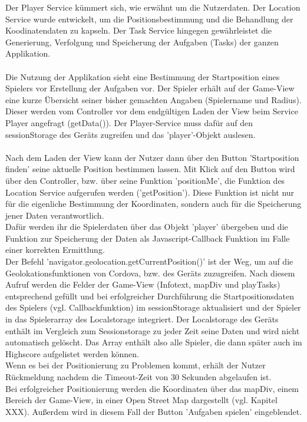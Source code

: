 Der Player Service kümmert sich, wie erwähnt um die Nutzerdaten. Der Location Service wurde entwickelt, um die Positionsbestimmung und die Behandlung der Koodinatendaten zu kapseln. Der Task Service hingegen gewährleistet die Generierung, Verfolgung und Speicherung der Aufgaben (Tasks) der ganzen Applikation.
\\
\\
Die Nutzung der Applikation sieht eine Bestimmung der Startposition eines Spielers vor Erstellung der Aufgaben vor. Der Spieler erhält auf der Game-View eine kurze Übersicht seiner bisher gemachten Angaben (Spielername und Radius). Dieser werden vom Controller vor dem endgültigen Laden der View beim Service Player angefragt (getData()). Der Player-Service muss dafür auf den sessionStorage des Geräts zugreifen und das 'player'-Objekt auslesen.
\\
\\
Nach dem Laden der View kann der Nutzer dann über den Button 'Startposition finden' seine aktuelle Position bestimmen lassen. Mit Klick auf den Button wird über den Controller, bzw. über seine Funktion 'positionMe', die Funktion des Location Service aufgerufen werden ('getPosition'). Diese Funktion ist nicht nur für die eigenliche Bestimmung der Koordinaten, sondern auch für die Speicherung jener Daten verantwortlich.
\\
Dafür werden ihr die Spielerdaten über das Objekt 'player' übergeben und die Funktion zur Speicherung der Daten als Javascript-Callback Funktion im Falle einer korrekten Ermittlung.
\\
Der Befehl 'navigator.geolocation.getCurrentPosition()' ist der Weg, um auf die Geolokationsfunktionen von Cordova, bzw. des Geräts zuzugreifen. Nach diesem Aufruf werden die Felder der Game-View (Infotext, mapDiv und playTasks) entsprechend gefüllt und bei erfolgreicher Durchführung die Startpositionsdaten des Spielers (vgl. Callbackfunktion) im sessionStorage aktualisiert und der Spieler in das Spielerarray des Localstorage integriert. Der Localstorage des Geräts enthält im Vergleich zum Sessionstorage zu jeder Zeit seine Daten und wird nicht automatisch gelöscht. Das Array enthält also alle Spieler, die dann später auch im Highscore aufgelistet werden können.
\\
Wenn es bei der Positionierung zu Problemen kommt, erhält der Nutzer Rückmeldung nachdem die Timeout-Zeit von 30 Sekunden abgelaufen ist.
\\
Bei erfolgreicher Positionierung werden die Koordinaten über das mapDiv, einem Bereich der Game-View, in einer Open Street Map dargestellt (vgl. Kapitel XXX). Außerdem wird in diesem Fall der Button 'Aufgaben spielen' eingeblendet.
